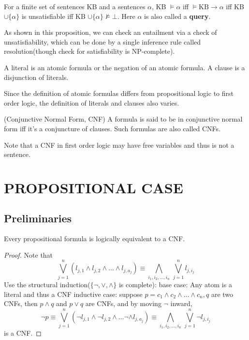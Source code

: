 \documentclass{article}
\begin{document}
\begin{pro}
For a finite set of sentences KB and a sentences $\alpha$, KB $\vDash \alpha$
iff $\vDash \text{KB}\to \alpha$ iff KB $\cup \{\alpha\}$ is unsatisfiable iff KB $\cup \{\alpha\} \nvDash \bot$. Here $\alpha$ is also called a \textbf{query}.
\end{pro}
\noindent As shown in this proposition, we can check an entailment via a check of unsatisfiability, which can be done by a single inference rule called resolution(though check for satisfiability is NP-complete).

\begin{defin}
A literal is an atomic formula or the negation of an atomic formula. A clause is a disjunction of literals.
\end{defin}
\noindent Since the definition of atomic formulas differs from propositional logic to first order logic, the definition of literals and clauses also varies.

\begin{defin}(Conjunctive Normal Form, CNF)\newline
A  formula is said to be in conjunctive normal form iff it's a conjuncture of clauses. Such formulas are also called CNFs.
\end{defin}
\noindent Note that a CNF in first order logic may have free variables and thus is not a sentence.

\section{PROPOSITIONAL CASE}
\subsection{Preliminaries}

\begin{pro}
Every propositional formula is logically equivalent to a CNF.
\end{pro}
\begin{proof}
Note that 
\[
\bigvee_{j=1}^n(l_{j,1} \wedge l_{j,2} \wedge \dots \wedge l_{j,a_j}) \equiv \bigwedge_{i_1,i_2,\dots,i_n}\,\bigvee_{j=1}^n l_{j,i_j}
\]
Use the structural induction($\{\neg, \vee, \wedge\}$ is complete):\newline
base case: Any atom is a literal and thus a CNF \newline
inductive case: suppose $p = c_1 \wedge c_2 \wedge \dots \wedge c_n,q$ are two CNFs, then
$p \wedge q$ and $p \vee q$ are CNFs, and by moving $\neg$ inward,
\[
\neg p \equiv \bigvee_{j=1}^n(\neg l_{j,1} \wedge \neg l_{j,2} \wedge \dots \neg \wedge l_{j,a_j}) \equiv \bigwedge_{i_1,i_2,\dots,i_n}\,\bigvee_{j=1}^n \neg l_{j,i_j}
\] is a CNF. 
\end{proof}
\end{document}
